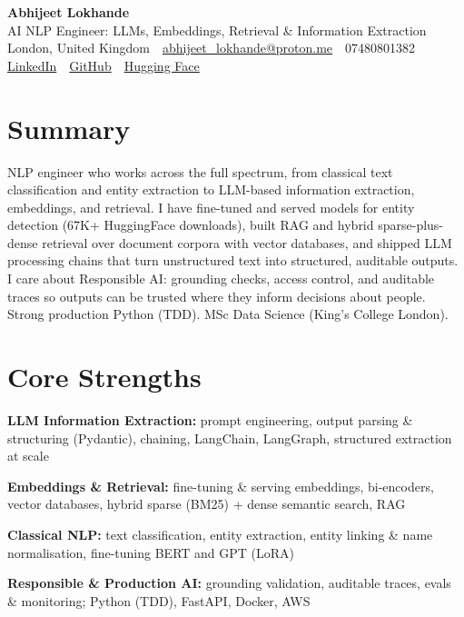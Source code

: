 \documentclass[10pt,a4paper]{article}
\newcommand{\sep}{\,\textcolor{accent!60}{\textbar}\,}
\begin{document}
\begin{center}
  {\fontsize{24}{26}\selectfont\bfseries Abhijeet Lokhande}\\[3pt]
  {\color{accent}\large AI NLP Engineer: LLMs, Embeddings, Retrieval \& Information Extraction}\\[5pt]
  {\small
    London, United Kingdom \sep
    \href{mailto:abhijeet_lokhande@proton.me}{abhijeet\_lokhande@proton.me} \sep
    07480801382 \\[2pt]
    \href{https://www.linkedin.com/in/ablds/}{LinkedIn} \sep
    \href{https://github.com/abhijeetscode}{GitHub} \sep
    \href{https://huggingface.co/ab-ai}{Hugging Face}
  }
\end{center}
\vspace{2pt}

\section{Summary}
NLP engineer who works across the full spectrum, from classical text classification and entity extraction to LLM-based information extraction, embeddings, and retrieval. I have fine-tuned and served models for entity detection (67K+ HuggingFace downloads), built RAG and hybrid sparse-plus-dense retrieval over document corpora with vector databases, and shipped LLM processing chains that turn unstructured text into structured, auditable outputs. I care about Responsible AI: grounding checks, access control, and auditable traces so outputs can be trusted where they inform decisions about people. Strong production Python (TDD). MSc Data Science (King's College London).

\section{Core Strengths}
\begin{tight}
  \item[\textcolor{accent}{\small$\bullet$}] \textbf{LLM Information Extraction:} prompt engineering, output parsing \& structuring (Pydantic), chaining, LangChain, LangGraph, structured extraction at scale
  \item[\textcolor{accent}{\small$\bullet$}] \textbf{Embeddings \& Retrieval:} fine-tuning \& serving embeddings, bi-encoders, vector databases, hybrid sparse (BM25) + dense semantic search, RAG
  \item[\textcolor{accent}{\small$\bullet$}] \textbf{Classical NLP:} text classification, entity extraction, entity linking \& name normalisation, fine-tuning BERT and GPT (LoRA)
  \item[\textcolor{accent}{\small$\bullet$}] \textbf{Responsible \& Production AI:} grounding validation, auditable traces, evals \& monitoring; Python (TDD), FastAPI, Docker, AWS
\end{tight}
\end{document}
